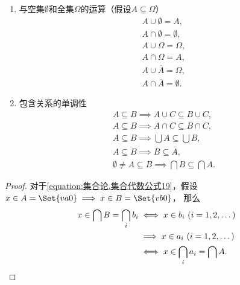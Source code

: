\begin{property}
\begin{enumerate}
\item 与空集\(\emptyset\)和全集\(\Omega\)的运算（假设\(A \subseteq \Omega\)）
\begin{gather}
A \cup \emptyset = A, \label{equation:集合论.集合代数公式9} \\
A \cap \emptyset = \emptyset, \label{equation:集合论.集合代数公式10} \\
A \cup \Omega = \Omega, \label{equation:集合论.集合代数公式11} \\
A \cap \Omega = A, \label{equation:集合论.集合代数公式12} \\
A \cup \overline{A} = \Omega, \label{equation:集合论.集合代数公式13} \\
A \cap \overline{A} = \emptyset. \label{equation:集合论.集合代数公式14}
\end{gather}

\item 包含关系的单调性
\begin{gather}
A \subseteq B \implies A \cup C \subseteq B \cup C, \label{equation:集合论.集合代数公式15} \\
A \subseteq B \implies A \cap C \subseteq B \cap C, \label{equation:集合论.集合代数公式16} \\
A \subseteq B \implies \bigcup A \subseteq \bigcup B, \label{equation:集合论.集合代数公式17} \\
A \subseteq B \implies \overline{B} \subseteq \overline{A}, \label{equation:集合论.集合代数公式18} \\
\emptyset \neq A \subseteq B \implies \bigcap B \subseteq \bigcap A. \label{equation:集合论.集合代数公式19}
\end{gather}
\end{enumerate}
\begin{proof}
对于\cref{equation:集合论.集合代数公式19}，假设\(x \in A = \Set{\v{a}{0}} \implies x \in B = \Set{\v{b}{0}}\)，%
那么
\begin{align*}
x \in \bigcap B = \bigcap_i b_i
&\iff
	x \in b_i\ (i=1,2,\dotsc) \\
&\implies
	x \in a_i\ (i=1,2,\dotsc) \\
&\iff
	x \in \bigcap_i a_i = \bigcap A.
\qedhere
\end{align*}
\end{proof}
\end{property}

